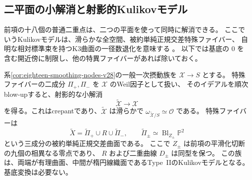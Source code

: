 \subsection{二平面の小解消と射影的Kulikovモデル}
\label{subsec:grassmann-kulikov-v28}

前項の十八個の普通二重点は、二つの平面を使って同時に解消できる。
ここでいうKulikovモデルは、滑らかな全空間、被約単純正規交差特殊ファイバー、
自明な相対標準束を持つK3曲面の一径数退化を意味する
\cite{KulikovDegenerations,PerssonPinkhamDegenerations}。
以下では基底の $0$ を含む開近傍に制限し、他の特異ファイバーがあれば除いておく。

\begin{theorem}[平面を用いた射影的小解消]
\label{thm:grassmann-kulikov-v28}
系\ref{cor:eighteen-smoothing-nodes-v28}の一般一次摂動族を
$\mathscr X\to S$ とする。
特殊ファイバーの二成分 $\Pi_+,\Pi_-$ を $\mathscr X$ のWeil因子として扱い、
そのイデアルを順次blow-upすると、射影的な小解消
\[
 \widetilde{\mathscr X}\longrightarrow\mathscr X
\]
を得る。これはcrepantであり、$\widetilde{\mathscr X}$ は滑らかで
$\omega_{\widetilde{\mathscr X}/S}\simeq\mathcal O$ である。
特殊ファイバーは
\[
 \widetilde X=\widetilde\Pi_+\cup R\cup\widetilde\Pi_-,\qquad
 \widetilde\Pi_\pm\simeq
 \operatorname{Bl}_{Z_\pm}\mathbb P^2
\]
という三成分の被約単純正規交差曲面である。
ここで $Z_\pm$ は前項の平滑化切断の九個の相異なる零点であり、
$R$ および二重曲線 $D_\pm$ は同型を保つ。
この族は、両端が有理曲面、中間が楕円線織面であるType~IIのKulikovモデルとなる。
基底変換は必要ない。
\end{theorem}

